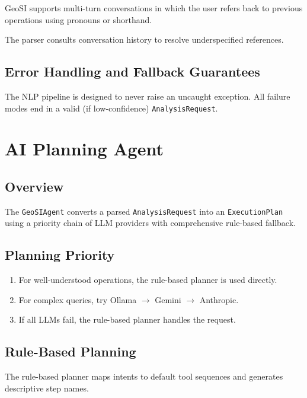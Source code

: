 \documentclass[12pt,a4paper]{report}
\begin{document}
GeoSI supports multi-turn conversations in which the user refers back to previous operations using pronouns or shorthand.

The parser consults conversation history to resolve underspecified references.

\section{Error Handling and Fallback Guarantees}

The NLP pipeline is designed to never raise an uncaught exception.  All failure modes end in a valid (if low-confidence) \texttt{AnalysisRequest}.

\chapter{AI Planning Agent}

\section{Overview}

The \texttt{GeoSIAgent} converts a parsed \texttt{AnalysisRequest} into an \texttt{ExecutionPlan}  using a priority chain of LLM providers with comprehensive rule-based fallback.

\section{Planning Priority}

\begin{enumerate}
  \item For well-understood operations, the rule-based planner is used directly.
  \item For complex queries, try Ollama $\rightarrow$ Gemini $\rightarrow$ Anthropic.
  \item If all LLMs fail, the rule-based planner handles the request.
\end{enumerate}

\section{Rule-Based Planning}

The rule-based planner maps intents to default tool sequences and generates descriptive step names.
\end{document}
